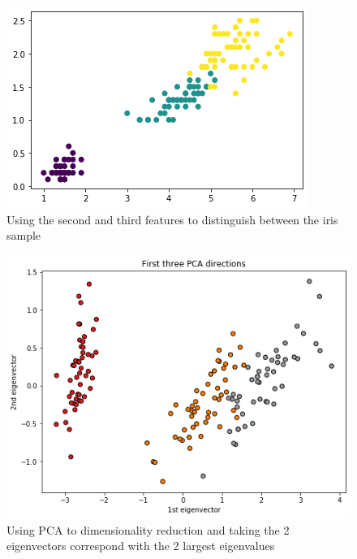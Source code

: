 \documentclass[12pt, a4paper]{paper}
\begin{document}
\newpage

\begin{figure}[h!]
\centering
\includegraphics[scale=0.6]{iris_features_2_3.png}
\caption{Using the second and third features to distinguish between the iris sample}
\label{fig:iris_3}
\end{figure}

\begin{figure}[h!]
\centering
\includegraphics[scale=0.4]{iris_with_PCA_2_eigenvectors.png}
\caption{Using PCA to dimensionality reduction and taking the 2 eigenvectors correspond with the 2 largest eigenvalues}
\label{fig:iris_3}
\end{figure}
\end{document}
